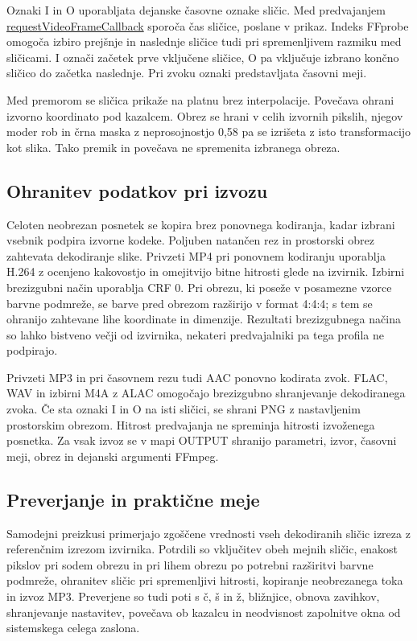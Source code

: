 \documentclass[12pt,a4paper]{article}
\begin{document}
Oznaki I in O uporabljata dejanske časovne oznake sličic. Med predvajanjem \href{https://developer.mozilla.org/en-US/docs/Web/API/HTMLVideoElement/requestVideoFrameCallback}{requestVideoFrameCallback} sporoča čas sličice, poslane v prikaz. Indeks FFprobe omogoča izbiro prejšnje in naslednje sličice tudi pri spremenljivem razmiku med sličicami. I označi začetek prve vključene sličice, O pa vključuje izbrano končno sličico do začetka naslednje. Pri zvoku oznaki predstavljata časovni meji.

Med premorom se sličica prikaže na platnu brez interpolacije. Povečava ohrani izvorno koordinato pod kazalcem. Obrez se hrani v celih izvornih pikslih, njegov moder rob in črna maska z neprosojnostjo 0,58 pa se izrišeta z isto transformacijo kot slika. Tako premik in povečava ne spremenita izbranega obreza.

\subsection*{Ohranitev podatkov pri izvozu}

Celoten neobrezan posnetek se kopira brez ponovnega kodiranja, kadar izbrani vsebnik podpira izvorne kodeke. Poljuben natančen rez in prostorski obrez zahtevata dekodiranje slike. Privzeti MP4 pri ponovnem kodiranju uporablja H.264 z ocenjeno kakovostjo in omejitvijo bitne hitrosti glede na izvirnik. Izbirni brezizgubni način uporablja CRF 0. Pri obrezu, ki poseže v posamezne vzorce barvne podmreže, se barve pred obrezom razširijo v format 4:4:4; s tem se ohranijo zahtevane lihe koordinate in dimenzije. Rezultati brezizgubnega načina so lahko bistveno večji od izvirnika, nekateri predvajalniki pa tega profila ne podpirajo.

Privzeti MP3 in pri časovnem rezu tudi AAC ponovno kodirata zvok. FLAC, WAV in izbirni M4A z ALAC omogočajo brezizgubno shranjevanje dekodiranega zvoka. Če sta oznaki I in O na isti sličici, se shrani PNG z nastavljenim prostorskim obrezom. Hitrost predvajanja ne spreminja hitrosti izvoženega posnetka. Za vsak izvoz se v mapi OUTPUT shranijo parametri, izvor, časovni meji, obrez in dejanski argumenti FFmpeg.

\subsection*{Preverjanje in praktične meje}

Samodejni preizkusi primerjajo zgoščene vrednosti vseh dekodiranih sličic izreza z referenčnim izrezom izvirnika. Potrdili so vključitev obeh mejnih sličic, enakost pikslov pri sodem obrezu in pri lihem obrezu po potrebni razširitvi barvne podmreže, ohranitev sličic pri spremenljivi hitrosti, kopiranje neobrezanega toka in izvoz MP3. Preverjene so tudi poti s č, š in ž, bližnjice, obnova zavihkov, shranjevanje nastavitev, povečava ob kazalcu in neodvisnost zapolnitve okna od sistemskega celega zaslona.
\end{document}
